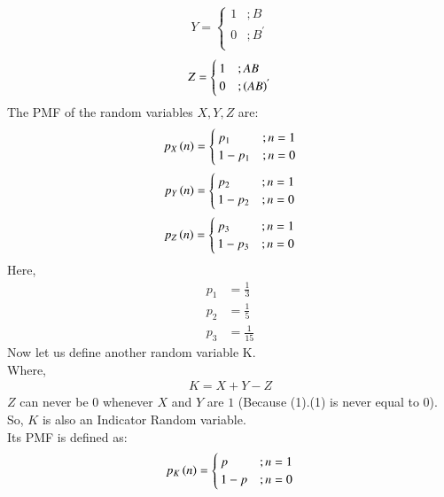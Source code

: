 \documentclass[journal]{IEEEtran}
\begin{document}
\begin{align}
	Y =
	\begin{cases}
		1 &; B\\
		0 &; B^{'}\\
	\end{cases}
\end{align}
\begin{align}
	Z =
	\begin{cases}
		1 &; AB\\
		0 &; \left(AB\right)^{'}\\
	\end{cases}
\end{align}
The PMF of the random variables $X,Y,Z$ are:
\begin{align}
	p_{X}\left(n\right) =
	\begin{cases}
		p_1 &; n = 1\\
		1 - p_1 &; n = 0
	\end{cases}
\end{align}
\begin{align}
	p_{Y}\left(n\right) =
	\begin{cases}
		p_2 & ;n = 1\\
		1 - p_2 &; n = 0
	\end{cases}
\end{align}
\begin{align}
	p_{Z}\left(n\right) =
	\begin{cases}
		p_3 &; n = 1\\
		1 - p_3 &; n = 0
	\end{cases}
\end{align}
Here,
\begin{align}
	p_1 &= \frac{1}{3}\\
	p_2 &= \frac{1}{5}\\
	p_3 &= \frac{1}{15}
\end{align}
Now let us define another random variable K.\\
Where,
\begin{align}
	K = X + Y - Z
\end{align}
$Z$ can never be $0$ whenever $X$ and $Y$ are $1$ (Because (1).(1) is never equal to 0).\\
So, $K$ is also an Indicator Random variable.\\
Its PMF is defined as:
\begin{align}
	p_{K}\left(n\right) =
	\begin{cases}
		p &; n = 1\\
		1 - p &; n = 0
	\end{cases}
\end{align}
\end{document}
